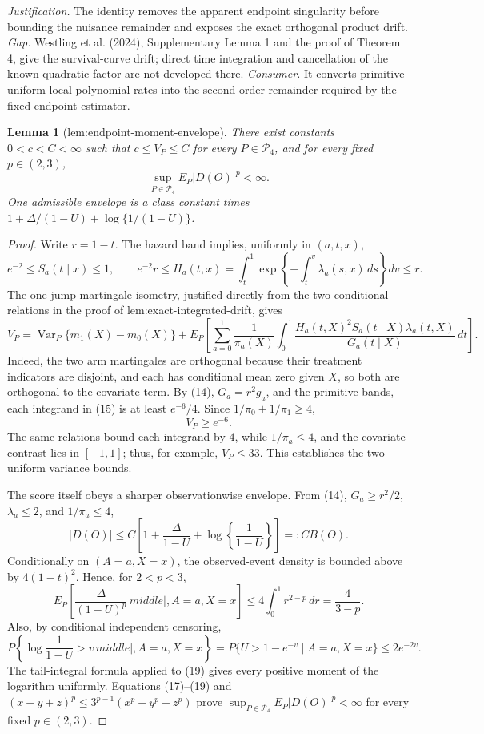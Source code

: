 \documentclass{article}
\newtheorem{lemma}{Lemma}
\begin{document}
\par\smallskip\noindent \textit{Justification.} The identity removes the apparent endpoint singularity before bounding the nuisance remainder and exposes the exact orthogonal product drift. \textit{Gap.} Westling et al. (2024), Supplementary Lemma 1 and the proof of Theorem 4, give the survival-curve drift; direct time integration and cancellation of the known quadratic factor are not developed there. \textit{Consumer.} It converts primitive uniform local-polynomial rates into the second-order remainder required by the fixed-endpoint estimator.

\begin{lemma}[lem:endpoint-moment-envelope]\label{lem:endpoint-moment-envelope}
There exist constants \(0<c<C<\infty\) such that \(c\le V_P\le C\) for every \(P\in\mathcal P_4\), and for every fixed \(p\in(2,3)\), \[\sup_{P\in\mathcal P_4}E_P|D(O)|^p<\infty.\] One admissible envelope is a class constant times \(1+\Delta/(1-U)+\log\{1/(1-U)\}\).
\end{lemma}
\begin{proof}
Write \(r=1-t\).  The hazard band implies, uniformly in \((a,t,x)\),
\[
 e^{-2}\le S_a(t\mid x)\le1,
 \qquad e^{-2}r\le H_a(t,x)=\int_t^1
 \exp\!\left\{-\int_t^v\lambda_a(s,x)\,ds\right\}dv\le r. \tag{14}
\]
The one-jump martingale isometry, justified directly from the two conditional relations in the proof of lem:exact-integrated-drift, gives
\[
 V_P=\operatorname{Var}_P\{m_1(X)-m_0(X)\}
 +E_P\!\left[\sum_{a=0}^1\frac1{\pi_a(X)}
 \int_0^1\frac{H_a(t,X)^2S_a(t\mid X)\lambda_a(t,X)}{G_a(t\mid X)}\,dt\right]. \tag{15}
\]
Indeed, the two arm martingales are orthogonal because their treatment indicators are disjoint, and each has conditional mean zero given \(X\), so both are orthogonal to the covariate term.  By (14), \(G_a=r^2g_a\), and the primitive bands, each integrand in (15) is at least \(e^{-6}/4\).  Since
\(1/\pi_0+1/\pi_1\ge4\),
\[
 V_P\ge e^{-6}. \tag{16}
\]
The same relations bound each integrand by \(4\), while \(1/\pi_a\le4\), and the covariate contrast lies in \([-1,1]\); thus, for example, \(V_P\le33\).  This establishes the two uniform variance bounds.

The score itself obeys a sharper observationwise envelope.  From (14), \(G_a\ge r^2/2\), \(\lambda_a\le2\), and \(1/\pi_a\le4\),
\[
 |D(O)|\le C\left[1+\frac{\Delta}{1-U}
 +\log\!\left\{\frac1{1-U}\right\}\right]=:C B(O). \tag{17}
\]
Conditionally on \((A=a,X=x)\), the observed-event density is bounded above by
\(4(1-t)^2\).  Hence, for \(2<p<3\),
\[
 E_P\!\left[\frac{\Delta}{(1-U)^p}\,middle|,A=a,X=x\right]
 \le4\int_0^1r^{2-p}\,dr=\frac4{3-p}. \tag{18}
\]
Also, by conditional independent censoring,
\[
 P\!\left\{\log\frac1{1-U}>v\,middle|,A=a,X=x\right\}
 =P\{U>1-e^{-v}\mid A=a,X=x\}
 \le2e^{-2v}. \tag{19}
\]
The tail-integral formula applied to (19) gives every positive moment of the logarithm uniformly.  Equations (17)--(19) and \((x+y+z)^p\le3^{p-1}(x^p+y^p+z^p)\) prove
\(\sup_{P\in\mathcal P_4}E_P|D(O)|^p<\infty\) for every fixed \(p\in(2,3)\).
\end{proof}
\end{document}

